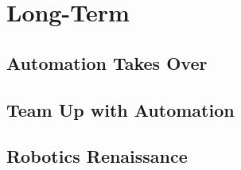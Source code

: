 \section{Long-Term}
\label{sec:long}

\subsection{Automation Takes Over}

\subsection{Team Up with Automation}

\subsection{Robotics Renaissance}